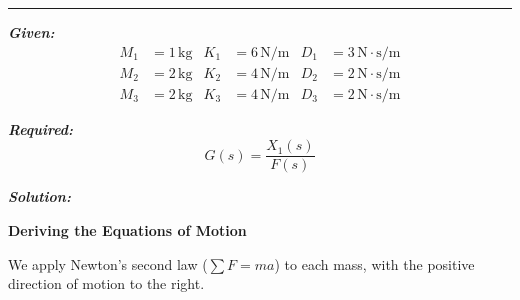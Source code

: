 ﻿\documentclass[11pt]{article}
\newcommand{\hspring}[2]{%
      \draw[spring] (#1) -- ++(2,0) node[midway, above=0.25cm]{#2};
    }
\newcommand{\hdamper}[2]{%
      \begin{scope}[shift={#1}]
        \draw (0,0) -- (0.5,0);                  %
        \draw (0.5,0) -- (0.5,0.3) -- (1.5,0.3);  %
        \draw (0.5,0) -- (0.5,-0.3) -- (1.5,-0.3);%
        
        \draw (1.0,0) -- (1.0,0.15);
        \draw (1.0,0) -- (1.0,-0.15);
        
        \draw (1.0,0) -- (2.0,0);
    
        \node[above] at (1,0.3) {#2};
      \end{scope}
    }
\newcommand{\tbody}[4]{
    \node[tbody] (#4) at (#1) {#2};
    \node at ([yshift=20mm]#4.center) {#3};
    \draw ([yshift=11mm]#4.center) -- ([yshift=18mm]#4.center);
    \draw[->] ([yshift=16mm, xshift=-4mm]#4.center) -- ([yshift=16mm, xshift=5mm]#4.center);
    }
\begin{document}
\begin{center}
\end{center}

\noindent\rule{\textwidth}{1pt}

\vspace{12pt}

\noindent\textbf{\textit{Given:}}
\[
\begin{aligned}
M_1 &= 1\, \text{kg} & K_1 &= 6\, \text{N/m} & D_1 &= 3\, \text{N}\cdot\text{s/m} \\
M_2 &= 2\, \text{kg} & K_2 &= 4\, \text{N/m} & D_2 &= 2\, \text{N}\cdot\text{s/m} \\
M_3 &= 2\, \text{kg} & K_3 &= 4\, \text{N/m} & D_3 &= 2\, \text{N}\cdot\text{s/m}
\end{aligned}
\]

\vspace{12pt}

\noindent \textbf{\textit{Required:}}
\[
G(s) = \frac{X_1(s)}{F(s)}
\]

\vspace{12pt}

\noindent \textbf{\textit{Solution:}}

\vspace{12pt}

\noindent \textbf{Deriving the Equations of Motion}
\vspace{12pt}

\noindent We apply Newton's second law ($\sum F = ma$) to each mass, with the positive direction of motion to the right. 
\end{document}
